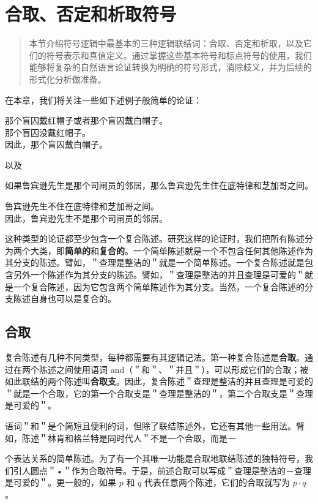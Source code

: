 \section{合取、否定和析取符号}

\begin{quotation}
本节介绍符号逻辑中最基本的三种逻辑联结词：合取、否定和析取，以及它们的符号表示和真值定义。通过掌握这些基本符号和标点符号的使用，我们能够将复杂的自然语言论证转换为明确的符号形式，消除歧义，并为后续的形式化分析做准备。
\end{quotation}

在本章，我们将关注一些如下述例子般简单的论证：

那个盲囚戴红帽子或者那个盲囚戴白帽子。\\
那个盲囚没戴红帽子。\\
因此，那个盲囚戴白帽子。

以及

如果鲁宾逊先生是那个司闸员的邻居，那么鲁宾逊先生住在底特律和芝加哥之间。

鲁宾逊先生不住在底特律和芝加哥之间。\\
因此，鲁宾逊先生不是那个司闸员的邻居。

这种类型的论证都至少包含一个复合陈述。研究这样的论证时，我们把所有陈述分为两个大类，即\textbf{简单的}和\textbf{复合的}。一个简单陈述就是一个不包含任何其他陈述作为其分支的陈述。臂如，＂查理是整洁的＂就是一个简单陈述。一个复合陈述就是包含另外一个陈述作为其分支的陈述。譬如，＂查理是整洁的并且查理是可爱的＂就是一个复合陈述，因为它包含两个简单陈述作为其分支。当然，一个复合陈述的分支陈述自身也可以是复合的。\cite{tarski1946}

\subsection{合取}
复合陈述有几种不同类型，每种都需要有其逻辑记法。第一种复合陈述是\textbf{合取}。通过在两个陈述之间使用语词 and（＂和＂、＂并且＂），可以形成它们的合取；被如此联结的两个陈述叫\textbf{合取支}。因此，复合陈述＂查理是整洁的并且查理是可爱的＂就是一个合取，它的第一个合取支是＂查理是整洁的＂，第二个合取支是＂查理是可爱的＂。

语词＂和＂是个简短且便利的词，但除了联结陈述外，它还有其他一些用法。臂如，陈述＂林肯和格兰特是同时代人＂不是一个合取，而是一

个表达关系的简单陈述。为了有一个其唯一功能是合取地联结陈述的独特符号，我们引人圆点＂•＂作为合取符号。于是，前述合取可以写成＂查理是整洁的－查理是可爱的＂。更一般的，如果 $p$ 和 $q$ 代表任意两个陈述，它们的合取就写为 $p \cdot q$ 。

